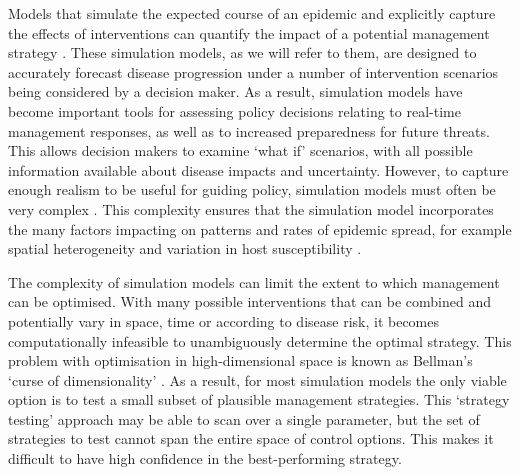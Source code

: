 Models that simulate the expected course of an epidemic and explicitly capture the effects of interventions can quantify the impact of a potential management strategy \citep{lofgren_opinion_2014}. These simulation models, as we will refer to them, are designed to accurately forecast disease progression under a number of intervention scenarios being considered by a decision maker. As a result, simulation models have become important tools for assessing policy decisions relating to real-time management responses, as well as to increased preparedness for future threats. This allows decision makers to examine `what if' scenarios, with all possible information available about disease impacts and uncertainty. However, to capture enough realism to be useful for guiding policy, simulation models must often be very complex \citep{basu_complexity_2013,savary_simulation_2014}. This complexity ensures that the simulation model incorporates the many factors impacting on patterns and rates of epidemic spread, for example spatial heterogeneity and variation in host susceptibility \citep{keeling_modeling_2008, anderson_preliminary_1986, smith_predicting_2002}.

The complexity of simulation models can limit the extent to which management can be optimised. With many possible interventions that can be combined and potentially vary in space, time or according to disease risk, it becomes computationally infeasible to unambiguously determine the optimal strategy. This problem with optimisation in high-dimensional space is known as Bellman's `curse of dimensionality' \citep{bellman_dynamic_1957}. As a result, for most simulation models the only viable option is to test a small subset of plausible management strategies. This `strategy testing' approach may be able to scan over a single parameter, but the set of strategies to test cannot span the entire space of control options. This makes it difficult to have high confidence in the best-performing strategy.

